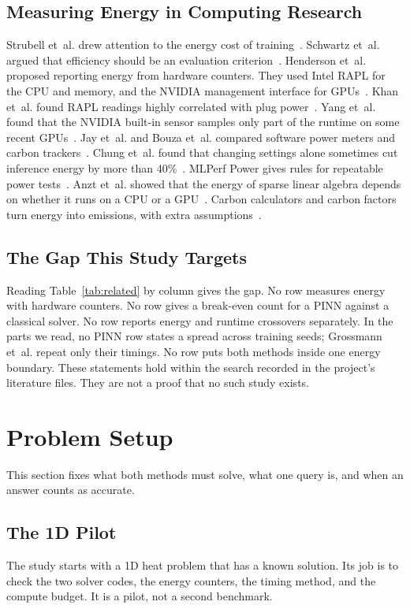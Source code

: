 \documentclass[journal]{IEEEtran}
\begin{document}
\subsection{Measuring Energy in Computing Research}
Strubell et~al. drew attention to the energy cost of training~\cite{strubell2019}. Schwartz et~al. argued that efficiency should be an evaluation criterion~\cite{schwartz2020}. Henderson et~al. proposed reporting energy from hardware counters. They used Intel RAPL for the CPU and memory, and the NVIDIA management interface for GPUs~\cite{henderson2020}. Khan et~al. found RAPL readings highly correlated with plug power~\cite{khan2018}. Yang et~al. found that the NVIDIA built-in sensor samples only part of the runtime on some recent GPUs~\cite{yang2024}. Jay et~al. and Bouza et~al. compared software power meters and carbon trackers~\cite{jay2023,bouza2023}. Chung et~al. found that changing settings alone sometimes cut inference energy by more than 40\%~\cite{chung2025}. MLPerf Power gives rules for repeatable power tests~\cite{mlperfpower2025}. Anzt et~al. showed that the energy of sparse linear algebra depends on whether it runs on a CPU or a GPU~\cite{anzt2017}. Carbon calculators and carbon factors turn energy into emissions, with extra assumptions~\cite{lacoste2019,dodge2022}.

\subsection{The Gap This Study Targets}
Reading Table~\ref{tab:related} by column gives the gap. No row measures energy with hardware counters. No row gives a break-even count for a PINN against a classical solver. No row reports energy and runtime crossovers separately. In the parts we read, no PINN row states a spread across training seeds; Grossmann et~al. repeat only their timings. No row puts both methods inside one energy boundary. These statements hold within the search recorded in the project's literature files. They are not a proof that no such study exists.

\section{Problem Setup}\label{sec:setup}

This section fixes what both methods must solve, what one query is, and when an answer counts as accurate.

\subsection{The 1D Pilot}
The study starts with a 1D heat problem that has a known solution. Its job is to check the two solver codes, the energy counters, the timing method, and the compute budget. It is a pilot, not a second benchmark.
\end{document}
